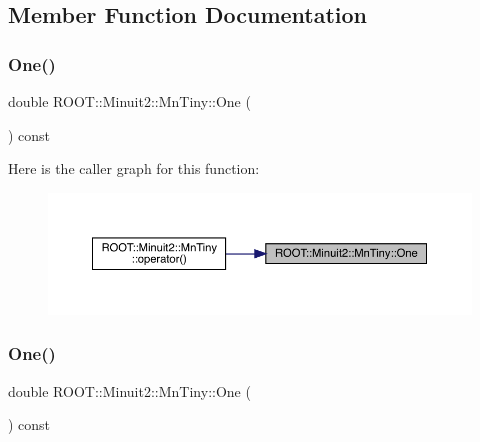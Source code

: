 \subsection{Member Function Documentation}
\mbox{\label{classROOT_1_1Minuit2_1_1MnTiny_a5934fc324da865f57dc05e5182248677}} 
\subsubsection{\texorpdfstring{One()}{One()}\hspace{0.1cm}{\footnotesize\ttfamily [1/3]}}
{\footnotesize\ttfamily double R\+O\+O\+T\+::\+Minuit2\+::\+Mn\+Tiny\+::\+One (\begin{DoxyParamCaption}{ }\end{DoxyParamCaption}) const}

Here is the caller graph for this function\+:
\nopagebreak
\begin{figure}[H]
\begin{center}
\leavevmode
\includegraphics[width=350pt]{d6/d77/classROOT_1_1Minuit2_1_1MnTiny_a5934fc324da865f57dc05e5182248677_icgraph}
\end{center}
\end{figure}
\mbox{\label{classROOT_1_1Minuit2_1_1MnTiny_a5934fc324da865f57dc05e5182248677}} 
\subsubsection{\texorpdfstring{One()}{One()}\hspace{0.1cm}{\footnotesize\ttfamily [2/3]}}
{\footnotesize\ttfamily double R\+O\+O\+T\+::\+Minuit2\+::\+Mn\+Tiny\+::\+One (\begin{DoxyParamCaption}{ }\end{DoxyParamCaption}) const}

